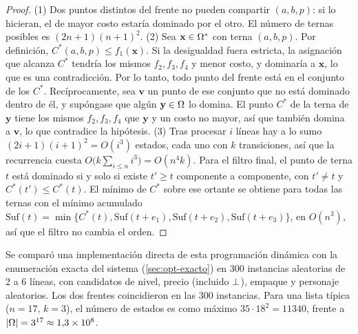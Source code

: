 \begin{proof}
(1) Dos puntos distintos del frente no pueden compartir $(a,b,p)$: si lo
hicieran, el de mayor costo estaría dominado por el otro. El número de ternas
posibles es $(2n+1)(n+1)^2$.
(2) Sea $\mathbf{x}\in\Omega^\ast$ con terna $(a,b,p)$. Por definición,
$C^\ast(a,b,p)\leq f_1(\mathbf{x})$. Si la desigualdad fuera estricta, la
asignación que alcanza $C^\ast$ tendría los mismos $f_2,f_3,f_4$ y menor
costo, y dominaría a $\mathbf{x}$, lo que es una contradicción. Por lo tanto,
todo punto del frente está en el conjunto de los $C^\ast$. Recíprocamente, sea
$\mathbf{v}$ un punto de ese conjunto que no está dominado dentro de él, y
supóngase que algún $\mathbf{y}\in\Omega$ lo domina. El punto $C^\ast$ de la
terna de $\mathbf{y}$ tiene los mismos $f_2,f_3,f_4$ que $\mathbf{y}$ y un
costo no mayor, así que también domina a $\mathbf{v}$, lo que contradice la
hipótesis.
(3) Tras procesar $i$ líneas hay a lo sumo $(2i+1)(i+1)^2=O(i^3)$ estados,
cada uno con $k$ transiciones, así que la recurrencia cuesta
$O\bigl(k\sum_{i\leq n}i^3\bigr)=O(n^4k)$. Para el filtro final, el punto de
terna $t$ está dominado si y solo si existe $t'\geq t$ componente a componente,
con $t'\neq t$ y $C^\ast(t')\leq C^\ast(t)$. El mínimo de $C^\ast$ sobre ese
ortante se obtiene para todas las ternas con el mínimo acumulado
$\mathrm{Suf}(t)=\min\{C^\ast(t),\mathrm{Suf}(t+e_1),\mathrm{Suf}(t+e_2),\mathrm{Suf}(t+e_3)\}$,
en $O(n^3)$, así que el filtro no cambia el orden.
\end{proof}

\begin{observacion}
Se comparó una implementación directa de esta programación dinámica con la
enumeración exacta del sistema (\cref{sec:opt-exacto}) en 300 instancias
aleatorias de 2 a 6 líneas, con candidatos de nivel, precio (incluido
$\bot$), empaque y personaje aleatorios. Los dos frentes coincidieron
en las 300 instancias. Para una lista típica ($n=17$, $k=3$), el número de
estados es como máximo $35\cdot18^2=\num{11340}$, frente a
$\left\lvert \Omega \right\rvert=3^{17}\approx1{,}3\times10^8$.
\end{observacion}

